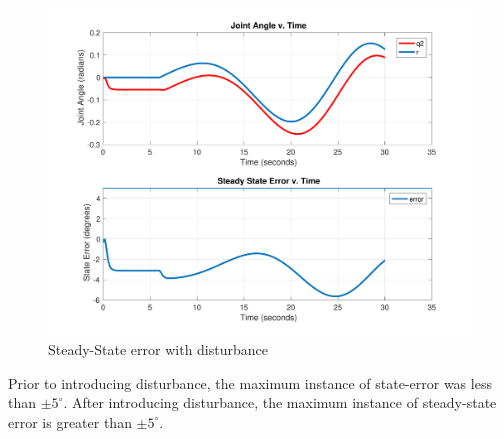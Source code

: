 \documentclass[12pt]{article}
\begin{document}
\begin{figure}[h!]
\includegraphics[width=1\textwidth]{StateErrorWithDisturbance.pdf}
\caption{Steady-State error with disturbance}
\label{error2b}
\end{figure}
\clearpage 
Prior to introducing disturbance, the maximum instance of state-error was less than $\pm5^{\circ}$. After introducing disturbance, the maximum instance of steady-state error is greater than $\pm5^{\circ}$. 
\end{document}
